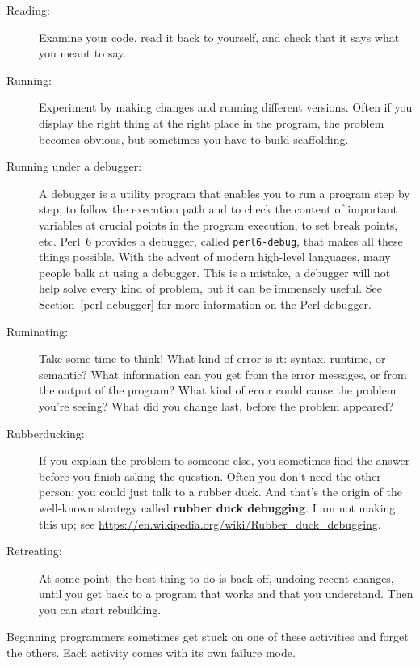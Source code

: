 \begin{description}

\item[Reading:] Examine your code, read it back to yourself, and
check that it says what you meant to say.

\item[Running:] Experiment by making changes and running different
versions.  Often if you display the right thing at the right place
in the program, the problem becomes obvious, but sometimes you have to
build scaffolding.

\item[Running under a debugger:] A debugger is a utility 
program that enables you to run a program step by step, 
to follow the execution path and to check the content of important 
variables at crucial points in the program execution, to set 
break points, etc. Perl~6 provides a debugger, called 
{\tt perl6-debug}, that makes all these things possible. With the 
advent of modern high-level languages, many people balk at 
using a debugger. This is a mistake, a debugger will not help 
solve every kind of problem, but it can be immensely 
useful. See Section~\ref{perl-debugger} for more information
on the Perl debugger.

\item[Ruminating:] Take some time to think!  What kind of error
is it: syntax, runtime, or semantic?  What information can you get from
the error messages, or from the output of the program?  What kind of
error could cause the problem you're seeing?  What did you change
last, before the problem appeared?

\item[Rubberducking:] If you explain the problem to someone else, you
sometimes find the answer before you finish asking the question.
Often you don't need the other person; you could just talk to a rubber
duck.  And that's the origin of the well-known strategy called {\bf
rubber duck debugging}.  I am not making this up; see 
\url{https://en.wikipedia.org/wiki/Rubber_duck_debugging}.

\item[Retreating:] At some point, the best thing to do is back
off, undoing recent changes, until you get back to a program that
works and that you understand.  Then you can start rebuilding.

\end{description}

Beginning programmers sometimes get stuck on one of these activities
and forget the others.  Each activity comes with its own failure
mode.

